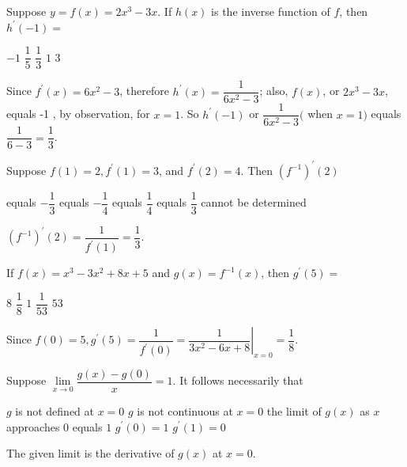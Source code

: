 \question
Suppose $y=f(x)=2 x^{3}-3 x$. If $h(x)$ is the inverse function of $f$, then $h^{\prime}(-1)=$
\begin{choices}
  \choice $-1$
  \choice $\dfrac{1}{5}$
  \CorrectChoice $\dfrac{1}{3}$
  \choice $1$
  \choice $3$
\end{choices}
\begin{solution}
Since $f^{\prime}(x)=6 x^{2}-3$, therefore $h^{\prime}(x)=\dfrac{1}{6 x^{2}-3}$; also, $f(x)$, or $2 x^{3}-3 x$, equals -1 , by observation, for $x=1$. So $h^{\prime}(-1)$ or $\dfrac{1}{6 x^{2}-3}($ when $x=1)$ equals $\dfrac{1}{6-3}=\dfrac{1}{3}$.
\end{solution}





\newpage



\question
Suppose $f(1)=2, f^{\prime}(1)=3$, and $f^{\prime}(2)=4$. Then $\left(f^{-1}\right)^{\prime}(2)$
\begin{choices}
  \choice equals $-\dfrac{1}{3}$
  \choice equals $-\dfrac{1}{4}$
  \choice equals $\dfrac{1}{4}$
  \CorrectChoice equals $\dfrac{1}{3}$
  \choice cannot be determined
\end{choices}
\begin{solution}
$\left(f^{-1}\right)^{\prime}(2)=\dfrac{1}{f^{\prime}(1)}=\dfrac{1}{3}$.
\end{solution}

\question
If $f(x)=x^{3}-3 x^{2}+8 x+5$ and $g(x)=f^{-1}(x)$, then $g^{\prime}(5)=$
\begin{choices}
  \choice $8$
  \CorrectChoice $\dfrac{1}{8}$
  \choice $1$
  \choice $\dfrac{1}{53}$
  \choice $53$
\end{choices}
\begin{solution}
Since $f(0)=5, g^{\prime}(5)=\dfrac{1}{f^{\prime}(0)}=\left.\dfrac{1}{3 x^{2}-6 x+8}\right|_{x=0}=\dfrac{1}{8}$.
\end{solution}

\question
Suppose $\lim\limits_{x \to 0} \dfrac{g(x)-g(0)}{x}=1$. It follows necessarily that
\begin{choices}
  \choice $g$ is not defined at $x=0$
  \choice $g$ is not continuous at $x=0$
  \choice the limit of $g(x)$ as $x$ approaches $0$ equals $1$
  \CorrectChoice $g^{\prime}(0)=1$
  \choice $g^{\prime}(1)=0$
\end{choices}
\begin{solution}
The given limit is the derivative of $g(x)$ at $x=0$.
\end{solution}





